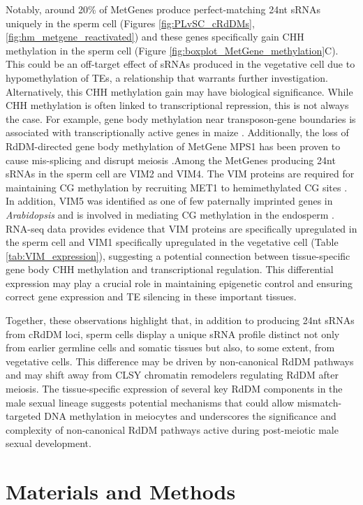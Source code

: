 Notably, around 20\% of MetGenes produce perfect-matching 24nt sRNAs uniquely in the sperm cell (Figures \ref{fig:PLvSC_cRdDMs}, \ref{fig:hm_metgene_reactivated}) and these genes specifically gain CHH methylation in the sperm cell (Figure \ref{fig:boxplot_MetGene_methylation}C). This could be an off-target effect of sRNAs produced in the vegetative cell due to hypomethylation of TEs, a relationship that warrants further investigation. Alternatively, this CHH methylation gain may have biological significance. While CHH methylation is often linked to transcriptional repression, this is not always the case.  For example, gene body methylation near transposon-gene boundaries is associated with transcriptionally active genes in maize \citep{RN277}. Additionally, the loss of RdDM-directed gene body methylation of MetGene MPS1 has been proven to cause mis-splicing and disrupt meiosis \citep{RN199}.Among the MetGenes producing 24nt sRNAs in the sperm cell are VIM2 and VIM4. The VIM proteins are required for maintaining CG methylation by recruiting MET1 to hemimethylated CG sites \citep{RN276}. In addition, VIM5 was identified as one of few paternally imprinted genes in \textit{Arabidopsis} and is involved in mediating CG methylation in the endosperm \citep{RN275}. RNA-seq data provides evidence that VIM proteins are specifically upregulated in the sperm cell and VIM1 specifically upregulated in the vegetative cell (Table \ref{tab:VIM_expression}), suggesting a potential connection between tissue-specific gene body CHH methylation and transcriptional regulation. This differential expression may play a crucial role in maintaining epigenetic control and ensuring correct gene expression and TE silencing in these important tissues.

Together, these observations highlight that, in addition to producing 24nt sRNAs from cRdDM loci, sperm cells display a unique sRNA profile  distinct not only from earlier germline cells and somatic tissues but also, to some extent, from vegetative cells. This difference may be driven by non-canonical RdDM pathways and may shift away from CLSY chromatin remodelers regulating RdDM after meiosis. The tissue-specific expression of several key RdDM components in the male sexual lineage suggests potential mechanisms that could allow mismatch-targeted DNA methylation in meiocytes and underscores the significance and complexity of non-canonical RdDM pathways active during post-meiotic male sexual development.

\clearpage

\section{Materials and Methods}

